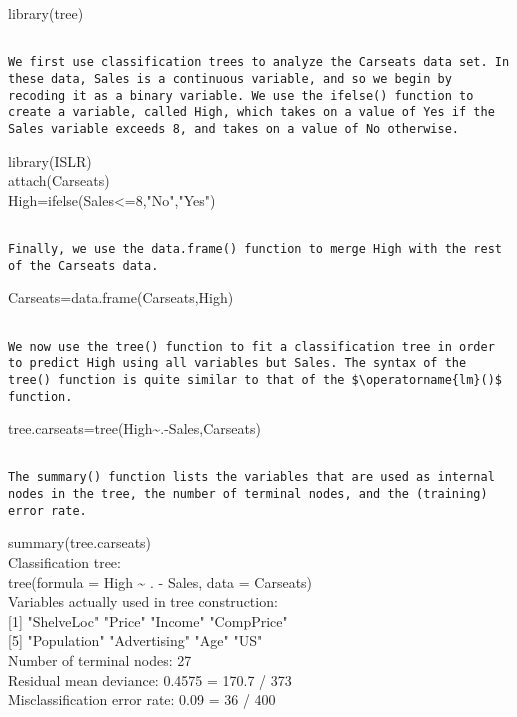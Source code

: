 \documentclass[10pt]{article}
\begin{document}
\begin{displayquote}
library(tree)
\end{displayquote}

\begin{verbatim}

We first use classification trees to analyze the Carseats data set. In these data, Sales is a continuous variable, and so we begin by recoding it as a binary variable. We use the ifelse() function to create a variable, called High, which takes on a value of Yes if the Sales variable exceeds 8, and takes on a value of No otherwise.
\end{verbatim}

\begin{displayquote}
library(ISLR)\\
attach(Carseats)\\
High=ifelse(Sales<=8,"No","Yes")
\end{displayquote}

\begin{verbatim}

Finally, we use the data.frame() function to merge High with the rest of the Carseats data.
\end{verbatim}

\begin{displayquote}
Carseats=data.frame(Carseats,High)
\end{displayquote}

\begin{verbatim}

We now use the tree() function to fit a classification tree in order to predict High using all variables but Sales. The syntax of the tree() function is quite similar to that of the $\operatorname{lm}()$ function.
\end{verbatim}

\begin{displayquote}
tree.carseats=tree(High\~{}.-Sales,Carseats)
\end{displayquote}

\begin{verbatim}

The summary() function lists the variables that are used as internal nodes in the tree, the number of terminal nodes, and the (training) error rate.
\end{verbatim}

\begin{displayquote}
summary(tree.carseats)\\
Classification tree:\\
tree(formula = High \~{} . - Sales, data = Carseats)\\
Variables actually used in tree construction:\\[0pt]
[1] "ShelveLoc" "Price" "Income" "CompPrice"\\[0pt]
[5] "Population" "Advertising" "Age" "US"\\
Number of terminal nodes: 27\\
Residual mean deviance: 0.4575 = 170.7 / 373\\
Misclassification error rate: 0.09 = 36 / 400

\end{displayquote}
\end{document}
